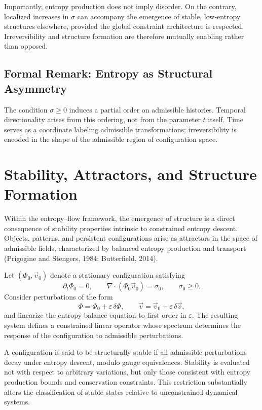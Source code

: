 \documentclass[11pt]{article}
\begin{document}
Importantly, entropy production does not imply disorder. On the contrary, localized increases in $\sigma$ can accompany the emergence of stable, low-entropy structures elsewhere, provided the global constraint architecture is respected. Irreversibility and structure formation are therefore mutually enabling rather than opposed.

\subsection*{Formal Remark: Entropy as Structural Asymmetry}

The condition $\sigma \ge 0$ induces a partial order on admissible histories. Temporal directionality arises from this ordering, not from the parameter $t$ itself. Time serves as a coordinate labeling admissible transformations; irreversibility is encoded in the shape of the admissible region of configuration space.

\section{Stability, Attractors, and Structure Formation}

Within the entropy–flow framework, the emergence of structure is a direct consequence of stability properties intrinsic to constrained entropy descent. Objects, patterns, and persistent configurations arise as attractors in the space of admissible fields, characterized by balanced entropy production and transport (Prigogine and Stengers, 1984; Butterfield, 2014).

Let $(\Phi_0,\vec{v}_0)$ denote a stationary configuration satisfying
\[
\partial_t \Phi_0 = 0,
\qquad
\nabla \cdot (\Phi_0 \vec{v}_0) = \sigma_0,
\qquad
\sigma_0 \ge 0.
\]
Consider perturbations of the form
\[
\Phi = \Phi_0 + \varepsilon \, \delta \Phi,
\qquad
\vec{v} = \vec{v}_0 + \varepsilon \, \delta \vec{v},
\]
and linearize the entropy balance equation to first order in $\varepsilon$. The resulting system defines a constrained linear operator whose spectrum determines the response of the configuration to admissible perturbations.

A configuration is said to be structurally stable if all admissible perturbations decay under entropy descent, modulo gauge equivalences. Stability is evaluated not with respect to arbitrary variations, but only those consistent with entropy production bounds and conservation constraints. This restriction substantially alters the classification of stable states relative to unconstrained dynamical systems.
\end{document}
